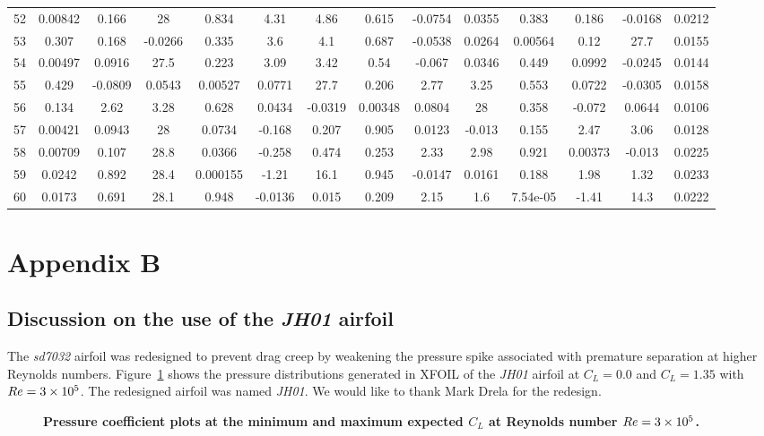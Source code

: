 \begin{longtable}{lccccccccccccc}
52 & 0.00842 & 0.166 & 28 & 0.834 & 4.31 & 4.86 & 0.615 & -0.0754 & 0.0355 & 0.383 & 0.186 & -0.0168 & 0.0212\\
53 & 0.307 & 0.168 & -0.0266 & 0.335 & 3.6 & 4.1 & 0.687 & -0.0538 & 0.0264 & 0.00564 & 0.12 & 27.7 & 0.0155\\
54 & 0.00497 & 0.0916 & 27.5 & 0.223 & 3.09 & 3.42 & 0.54 & -0.067 & 0.0346 & 0.449 & 0.0992 & -0.0245 & 0.0144\\
55 & 0.429 & -0.0809 & 0.0543 & 0.00527 & 0.0771 & 27.7 & 0.206 & 2.77 & 3.25 & 0.553 & 0.0722 & -0.0305 & 0.0158\\
56 & 0.134 & 2.62 & 3.28 & 0.628 & 0.0434 & -0.0319 & 0.00348 & 0.0804 & 28 & 0.358 & -0.072 & 0.0644 & 0.0106\\
57 & 0.00421 & 0.0943 & 28 & 0.0734 & -0.168 & 0.207 & 0.905 & 0.0123 & -0.013 & 0.155 & 2.47 & 3.06 & 0.0128\\
58 & 0.00709 & 0.107 & 28.8 & 0.0366 & -0.258 & 0.474 & 0.253 & 2.33 & 2.98 & 0.921 & 0.00373 & -0.013 & 0.0225\\
59 & 0.0242 & 0.892 & 28.4 & 0.000155 & -1.21 & 16.1 & 0.945 & -0.0147 & 0.0161 & 0.188 & 1.98 & 1.32 & 0.0233\\
60 & 0.0173 & 0.691 & 28.1 & 0.948 & -0.0136 & 0.015 & 0.209 & 2.15 & 1.6 & 7.54e-05 & -1.41 & 14.3 & 0.0222 \\
\bottomrule
\end{longtable}
\normalsize

\section*{Appendix B}

\subsection{Discussion on the use of the \emph{JH01} airfoil}

The \emph{sd7032} airfoil was redesigned to prevent drag creep by weakening the pressure spike associated with premature separation at higher Reynolds numbers.  
Figure~\ref{f:jhcps} shows the pressure distributions generated in XFOIL of the \emph{JH01} airfoil at $C_L=0.0$ and $C_L=1.35$ with $Re=\num{3d5}$.
The redesigned airfoil was named \emph{JH01}. We would like to thank Mark Drela for the redesign.

\begin{figure}[H]
 \begin{subfigmatrix}{2}%
 \end{subfigmatrix}
 \caption{\textbf{Pressure coefficient plots at the minimum and maximum expected $C_L$ at Reynolds number $Re=\num{3d5}$.}}
 \label{f:jhcps}
\end{figure}

